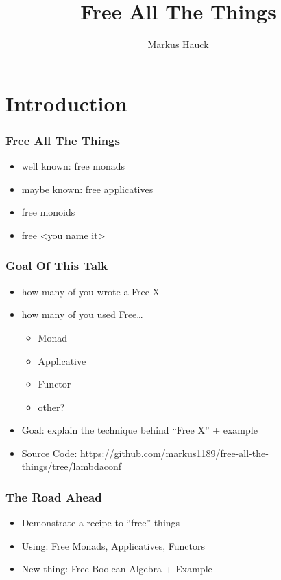 \documentclass{beamer}
\title{Free All The Things}
\author{Markus Hauck}
\begin{document}
\begin{frame}
  \titlepage{}
\end{frame}

\section{Introduction}\label{sec:introduction}

\begin{frame}
\frametitle{Free All The Things}
\begin{itemize}
\item well known: free monads
\item maybe known: free applicatives
\item free monoids
\item free <you name it>
\end{itemize}
\end{frame}

\begin{frame}
  \frametitle{Goal Of This Talk}
  \begin{itemize}
  \item how many of you wrote a Free X
  \item how many of you used Free\ldots
    \begin{itemize}
    \item Monad
    \item Applicative
    \item Functor
    \item other?
    \end{itemize}
  \item Goal: explain the technique behind ``Free X'' + example
  \item Source Code: \url{https://github.com/markus1189/free-all-the-things/tree/lambdaconf}
  \end{itemize}
\end{frame}

\begin{frame}
  \frametitle{The Road Ahead}
  \begin{itemize}
  \item Demonstrate a recipe to ``free'' things
  \item Using: Free Monads, Applicatives, Functors
  \item New thing: Free Boolean Algebra + Example
  \end{itemize}
\end{frame}
\end{document}

